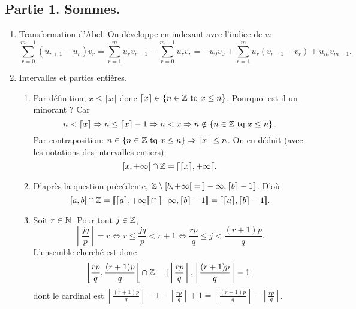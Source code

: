 \subsection*{Partie 1. Sommes.}
\begin{enumerate}
  \item Transformation d'Abel. On développe en indexant avec l'indice de $u$:
\[
  \sum_{r=0}^{m-1}(u_{r+1} - u_r)v_r = \sum_{r=1}^{m}u_{r}v_{r-1} -  \sum_{r=0}^{m-1}u_r v_r
  = -u_0 v_0 + \sum_{r=1}^{m}u_{r}(v_{r-1} - v_r) + u_m v_{m-1}. 
\]

  \item Intervalles et parties entières.
  \begin{enumerate}
    \item Par définition, $ x \leq \lceil x \rceil$ donc $\lceil x \rceil \in \left\lbrace n \in \mathbb{Z} \text{ tq } x \leq n \right\rbrace$.\newline
    Pourquoi est-il un minorant ? Car 
\[
  n < \lceil x \rceil \Rightarrow n \leq \lceil x \rceil - 1 \Rightarrow n < x \Rightarrow n \notin \left\lbrace n \in \mathbb{Z} \text{ tq } x \leq n \right\rbrace.
\]
Par contraposition: $n \in \left\lbrace n \in \mathbb{Z} \text{ tq } x \leq n \right\rbrace \Rightarrow \lceil x \rceil \leq n$.\newline
On en déduit (avec les notations des intervalles entiers):
\[
  \left[ x, + \infty \right[ \cap \mathbb{Z} = \llbracket \lceil x \rceil , +\infty \llbracket.
\]

    \item D'après la question précédente, $\mathbb{Z} \setminus \left[ b, +\infty \right[ = \,\rrbracket - \infty, \lceil b \rceil - 1\rrbracket$. D'où
\[
  \left[ a, b \right[ \cap \mathbb{Z}
  = \llbracket \lceil a \rceil , + \infty \llbracket \, \cap \, \llbracket -\infty , \lceil b \rceil - 1 \rrbracket
  = \llbracket \lceil a \rceil , \lceil b \rceil - 1 \rrbracket.
\]

    \item Soit $r\in \mathbb{N}$. Pour tout $j\in \mathbb{Z}$,
\[
  \left\lfloor \frac{jq}{p} \right\rfloor = r \Leftrightarrow r \leq \frac{jq}{p} < r + 1
  \Leftrightarrow \frac{rp}{q} \leq j < \frac{(r+1)p}{q}.
\]
L'ensemble cherché est donc 
\[
\left[ \frac{rp}{q}, \frac{(r+1)p}{q}\right[ \cap \mathbb{Z}
= \llbracket \left\lceil \frac{rp}{q}\right\rceil, \left\lceil\frac{(r+1)p}{q} \right\rceil - 1 \rrbracket  
\]
dont le cardinal est $\left\lceil\frac{(r+1)p}{q} \right\rceil - 1 - \left\lceil \frac{rp}{q}\right\rceil + 1 = \left\lceil\frac{(r+1)p}{q} \right\rceil - \left\lceil \frac{rp}{q}\right\rceil$.


\end{enumerate}
\end{enumerate}
